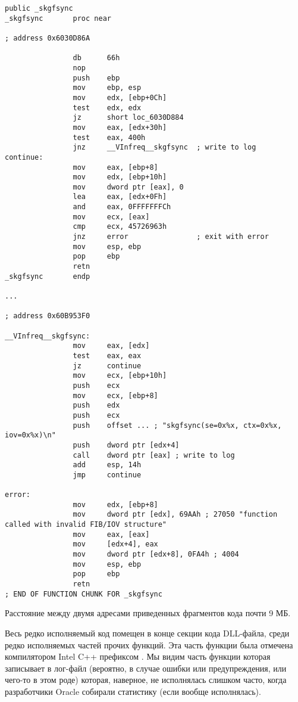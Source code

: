 \begin{lstlisting}[caption=orageneric11.dll (win32),style=customasmx86]
                public _skgfsync
_skgfsync       proc near

; address 0x6030D86A

                db      66h
                nop
                push    ebp
                mov     ebp, esp
                mov     edx, [ebp+0Ch]
                test    edx, edx
                jz      short loc_6030D884
                mov     eax, [edx+30h]
                test    eax, 400h
                jnz     __VInfreq__skgfsync  ; write to log
continue:
                mov     eax, [ebp+8]
                mov     edx, [ebp+10h]
                mov     dword ptr [eax], 0
                lea     eax, [edx+0Fh]
                and     eax, 0FFFFFFFCh
                mov     ecx, [eax]
                cmp     ecx, 45726963h
                jnz     error                ; exit with error
                mov     esp, ebp
                pop     ebp
                retn
_skgfsync       endp

...

; address 0x60B953F0

__VInfreq__skgfsync:
                mov     eax, [edx]
                test    eax, eax
                jz      continue
                mov     ecx, [ebp+10h]
                push    ecx
                mov     ecx, [ebp+8]
                push    edx
                push    ecx
                push    offset ... ; "skgfsync(se=0x%x, ctx=0x%x, iov=0x%x)\n"
                push    dword ptr [edx+4]
                call    dword ptr [eax] ; write to log
                add     esp, 14h
                jmp     continue

error:
                mov     edx, [ebp+8]
                mov     dword ptr [edx], 69AAh ; 27050 "function called with invalid FIB/IOV structure"
                mov     eax, [eax]
                mov     [edx+4], eax
                mov     dword ptr [edx+8], 0FA4h ; 4004
                mov     esp, ebp
                pop     ebp
                retn
; END OF FUNCTION CHUNK FOR _skgfsync
\end{lstlisting}

Расстояние между двумя адресами приведенных фрагментов кода почти 9 МБ.

Весь редко исполняемый код помещен в конце секции кода DLL-файла, среди редко
исполняемых частей прочих функций.
Эта часть функции была отмечена компилятором Intel C++ префиксом .
Мы видим часть функции которая записывает в лог-файл (вероятно, в случае ошибки или предупреждения,
или чего-то в этом роде) которая, наверное, не исполнялась слишком часто, когда разработчики Oracle
собирали статистику (если вообще исполнялась).

